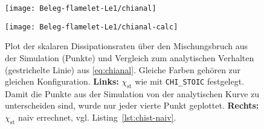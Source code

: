\begin{figure}[H]\begin{center}
    \begin{minipage}{0.5\linewidth}\begin{center}
        \texttt{[image: Beleg-flamelet-Le1/chianal]}
    \end{center}\end{minipage}\begin{minipage}{0.5\linewidth}\begin{center}
        \texttt{[image: Beleg-flamelet-Le1/chianal-calc]}
    \end{center}\end{minipage}
    \caption{Plot der skalaren Dissipationsraten über den Mischungsbruch aus der Simulation (Punkte) und Vergleich zum analytischen Verhalten (gestrichelte Linie) aus \autoref{eq:chianal}. Gleiche Farben gehören zur gleichen Konfiguration. \textbf{Links:} $\chi_\mathrm{st}$ wie mit \lstinline!CHI_STOIC! festgelegt. Damit die Punkte aus der Simulation von der analytischen Kurve zu unterscheiden sind, wurde nur jeder vierte Punkt geplottet. \textbf{Rechts:} $\chi_\mathrm{st}$ naiv errechnet, vgl. Listing~\ref{lst:chist-naiv}.}
    \label{fig:flameletLe1:chianal}
\end{center}\end{figure}

